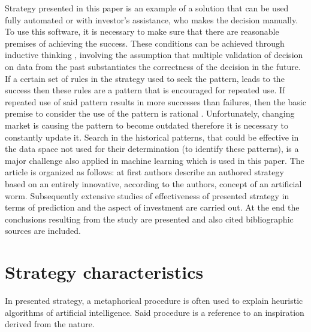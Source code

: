\documentclass[runningheads,a4paper]{llncs}
\begin{document}
Strategy presented in this paper is an example of a solution that can be used fully automated or with investor’s assistance, who makes the decision manually. To use this software, it is necessary to make sure that there are reasonable premises of achieving the success. These conditions can be achieved through inductive thinking \cite{provost,KleskWilinski}, involving the assumption that multiple validation of decision on data from the past substantiates the correctness of the decision in the future. If a certain set of rules in the strategy used to seek the pattern, leads to the success then these rules are a pattern that is encouraged for repeated use. If repeated use of said pattern results in more successes than failures, then the basic premise to consider the use of the pattern is rational \cite{bishop2006pattern,KleskWilinski}. Unfortunately, changing market is causing the pattern to become outdated therefore it is necessary to constantly update it. Search in the historical patterns, that could be effective in the data space not used for their determination (to identify these patterns), is a major challenge also applied in machine learning which is used in this paper.
The article is organized as follows: at first authors describe an authored strategy based on an entirely innovative, according to the authors, concept of an artificial worm. Subsequently extensive studies of effectiveness of presented strategy in terms of prediction and the aspect of investment are carried out. At the end the conclusions resulting from the study are presented and also cited bibliographic sources are included.

\section{Strategy characteristics}
In presented strategy, a metaphorical procedure is often used to explain heuristic algorithms of artificial intelligence. Said procedure is a reference to an inspiration derived from the nature.\\
\end{document}

